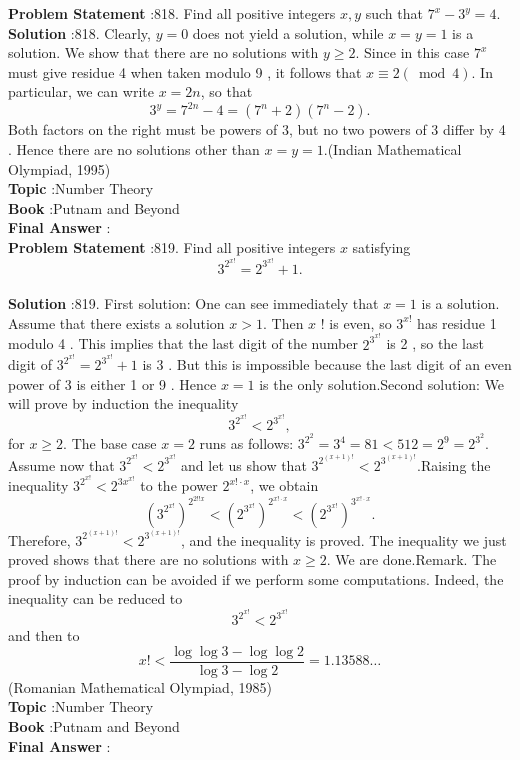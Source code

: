 \documentclass[10pt]{article}
\begin{document}
\textbf{Problem Statement} :818. Find all positive integers $x, y$ such that $7^{x}-3^{y}=4$.\\
\textbf{Solution} :818. Clearly, $y=0$ does not yield a solution, while $x=y=1$ is a solution. We show that there are no solutions with $y \geq 2$. Since in this case $7^{x}$ must give residue 4 when taken modulo 9 , it follows that $x \equiv 2(\bmod 4)$. In particular, we can write $x=2 n$, so that$$ 3^{y}=7^{2 n}-4=\left(7^{n}+2\right)\left(7^{n}-2\right) . $$Both factors on the right must be powers of 3, but no two powers of 3 differ by 4 . Hence there are no solutions other than $x=y=1$.(Indian Mathematical Olympiad, 1995)\\
\textbf{Topic} :Number Theory\\
\textbf{Book} :Putnam and Beyond\\
\textbf{Final Answer} :\\


\textbf{Problem Statement} :819. Find all positive integers $x$ satisfying$$ 3^{2^{x !}}=2^{3^{x !}}+1 . $$\\
\textbf{Solution} :819. First solution: One can see immediately that $x=1$ is a solution. Assume that there exists a solution $x>1$. Then $x$ ! is even, so $3^{x !}$ has residue 1 modulo 4 . This implies that the last digit of the number $2^{3^{x !}}$ is 2 , so the last digit of $3^{2^{x !}}=2^{3^{x !}}+1$ is 3 . But this is impossible because the last digit of an even power of 3 is either 1 or 9 . Hence $x=1$ is the only solution.Second solution: We will prove by induction the inequality$$ 3^{2^{x !}}<2^{3^{x !}}, $$for $x \geq 2$. The base case $x=2$ runs as follows: $3^{2^{2}}=3^{4}=81<512=2^{9}=2^{3^{2}}$. Assume now that $3^{2^{x !}}<2^{3^{x !}}$ and let us show that $3^{2^{(x+1) !}}<2^{3^{(x+1) !}}$.Raising the inequality $3^{2^{x !}}<2^{3 x^{x !}}$ to the power $2^{x ! \cdot x}$, we obtain$$ \left(3^{2^{x !}}\right)^{2^{2 ! ! x}}<\left(2^{3^{x !}}\right)^{2^{x ! \cdot x}}<\left(2^{3^{x !}}\right)^{3^{x ! \cdot x}} . $$Therefore, $3^{2^{(x+1) !}}<2^{3^{(x+1) !}}$, and the inequality is proved. The inequality we just proved shows that there are no solutions with $x \geq 2$. We are done.Remark. The proof by induction can be avoided if we perform some computations. Indeed, the inequality can be reduced to$$ 3^{2^{x !}}<2^{3^{x !}} $$and then to$$ x !<\frac{\log \log 3-\log \log 2}{\log 3-\log 2}=1.13588 \ldots $$(Romanian Mathematical Olympiad, 1985) \\
\textbf{Topic} :Number Theory\\
\textbf{Book} :Putnam and Beyond\\
\textbf{Final Answer} :\\
\end{document}
